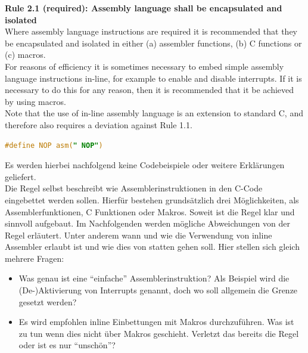 \documentclass[a4paper,UKenglish,cleveref, autoref]{templates/lipics-v2019}
\begin{document}
    \noindent
    \begin{minipage}{\linewidth}
        \begin{example}
            \textbf{Rule 2.1 (required): Assembly language shall be encapsulated and isolated\cite{MISRA2004}}\\
            Where assembly language instructions are required it is recommended that they be encapsulated
            and isolated in either (a) assembler functions, (b) C functions or (c) macros.\\
            For reasons of efficiency it is sometimes necessary to embed simple assembly language instructions
            in-line, for example to enable and disable interrupts.
            If it is necessary to do this for any reason, then it is recommended that it be achieved by using macros.\\
            Note that the use of in-line assembly language is an extension to standard C, and therefore also
            requires a deviation against Rule 1.1.
            \begin{lstlisting}[language=C]
                #define NOP asm(" NOP")
            \end{lstlisting}
        \end{example}
    \end{minipage}
    Es werden hierbei nachfolgend keine Codebeispiele oder weitere Erklärungen geliefert.\\

    Die Regel selbst beschreibt wie Assemblerinstruktionen in den C-Code eingebettet werden sollen.
    Hierfür bestehen grundsätzlich drei Möglichkeiten, als Assemblerfunktionen, C Funktionen oder Makros.
    Soweit ist die Regel klar und sinnvoll aufgebaut.
    Im Nachfolgenden werden mögliche Abweichungen von der Regel erläutert.
    Unter anderem wann und wie die Verwendung von inline Assembler erlaubt ist und wie dies von statten gehen soll.
    Hier stellen sich gleich mehrere Fragen:

    \begin{itemize}
        \item Was genau ist eine \enquote{einfache} Assemblerinstruktion?
            Als Beispiel wird die (De-)Aktivierung von Interrupts genannt, doch wo soll allgemein die Grenze gesetzt werden?
        \item Es wird empfohlen inline Einbettungen mit Makros durchzuführen.
            Was ist zu tun wenn dies nicht über Makros geschieht.
            Verletzt das bereits die Regel oder ist es nur \enquote{unschön}?
    \end{itemize}
\end{document}
